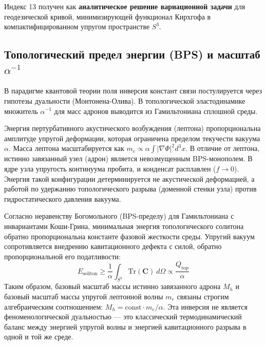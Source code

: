 \documentclass[12pt,a4paper]{article}
\begin{document}
	Индекс 13 получен как \textbf{аналитическое решение вариационной задачи} для геодезической кривой, минимизирующей функционал Кирхгофа в компактифицированном упругом пространстве $S^3$.
	
	\subsection{Топологический предел энергии (BPS) и масштаб $\alpha^{-1}$}
	В парадигме квантовой теории поля инверсия констант связи постулируется через гипотезы дуальности (Монтонена-Олива). В топологической эластодинамике множитель $\alpha^{-1}$ для масс адронов выводится из Гамильтониана сплошной среды.
	
	Энергия пертурбативного акустического возбуждения (лептона) пропорциональна амплитуде упругой деформации, которая ограничена пределом текучести вакуума $\alpha$. Масса лептона масштабируется как $m_e \propto \alpha \int |\nabla \Phi|^2 d^3x$.
	В отличие от лептона, истинно завязанный узел (адрон) является невозмущенным BPS-монополем. В ядре узла упругость континуума пробита, и конденсат расплавлен ($f \to 0$). Энергия такой конфигурации детерминируется не акустической деформацией, а работой по удержанию топологического разрыва (доменной стенки узла) против гидростатического давления вакуума. 
	
	Согласно неравенству Богомольного (BPS-пределу) для Гамильтониана с инвариантами Коши-Грина, минимальная энергия топологического солитона обратно пропорциональна константе фазовой жесткости среды. Упругий вакуум сопротивляется внедрению кавитационного дефекта с силой, обратно пропорциональной его податливости:
	\begin{equation}
		E_{\text{soliton}} \ge \frac{1}{\alpha} \int_{S^3} \text{Tr}(\mathbf{C}) \ d\Omega \propto \frac{Q_{\text{top}}}{\alpha}
	\end{equation}
	Таким образом, базовый масштаб массы истинно завязанного адрона $M_h$ и базовый масштаб массы упругой лептонной волны $m_e$ связаны строгим алгебраическим соотношением: $M_h = \text{const} \cdot m_e / \alpha$. Эта инверсия не является феноменологической дуальностью — это классический термодинамический баланс между энергией упругой волны и энергией кавитационного разрыва в одной и той же среде.
	
\end{document}
